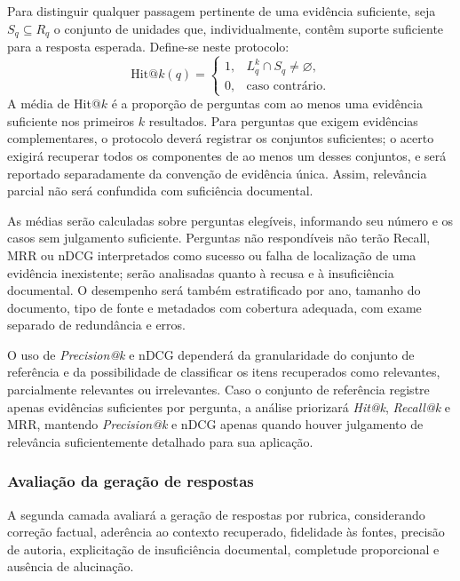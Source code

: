Para distinguir qualquer passagem pertinente de uma evidência suficiente, seja $S_q\subseteq R_q$ o conjunto de unidades que, individualmente, contêm suporte suficiente para a resposta esperada. Define-se neste protocolo:
\begin{equation}
\mathrm{Hit@}k(q)=\begin{cases}1,&L_q^k\cap S_q\ne\varnothing,\\0,&\text{caso contrário}.\end{cases}
\label{eq:hit}
\end{equation}
A média de Hit@$k$ é a proporção de perguntas com ao menos uma evidência suficiente nos primeiros $k$ resultados. Para perguntas que exigem evidências complementares, o protocolo deverá registrar os conjuntos suficientes; o acerto exigirá recuperar todos os componentes de ao menos um desses conjuntos, e será reportado separadamente da convenção de evidência única. Assim, relevância parcial não será confundida com suficiência documental.

As médias serão calculadas sobre perguntas elegíveis, informando seu número e os casos sem julgamento suficiente. Perguntas não respondíveis não terão Recall, MRR ou nDCG interpretados como sucesso ou falha de localização de uma evidência inexistente; serão analisadas quanto à recusa e à insuficiência documental. O desempenho será também estratificado por ano, tamanho do documento, tipo de fonte e metadados com cobertura adequada, com exame separado de redundância e erros.

O uso de \textit{Precision@k} e nDCG dependerá da granularidade do conjunto de referência e da possibilidade de classificar os itens recuperados como relevantes, parcialmente relevantes ou irrelevantes. Caso o conjunto de referência registre apenas evidências suficientes por pergunta, a análise priorizará \textit{Hit@k}, \textit{Recall@k} e MRR, mantendo \textit{Precision@k} e nDCG apenas quando houver julgamento de relevância suficientemente detalhado para sua aplicação.

\subsubsection{Avaliação da geração de respostas}\label{sec:rubrica}

A segunda camada avaliará a geração de respostas por rubrica, considerando correção factual, aderência ao contexto recuperado,
fidelidade às fontes, precisão de autoria, explicitação de insuficiência documental, completude proporcional e ausência de alucinação.

